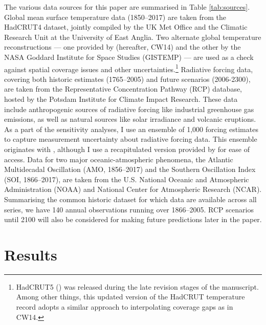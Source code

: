 \documentclass[smallextended]{svjour3}       %
\begin{document}
The various data sources for this paper are summarised in Table
\ref{tab:sources}. Global mean surface temperature data (1850--2017) are
taken from the HadCRUT4 dataset, jointly compiled by the UK Met Office
and the Climatic Research Unit at the University of East Anglia. Two
alternate global temperature reconstructions --- one provided by
\cite{cowtan2014coverage} (hereafter, CW14) and the other by the NASA
Goddard Institute for Space Studies (GISTEMP) --- are used as a check
against spatial coverage issues and other uncertainties.\footnote{HadCRUT5
  (\cite{morice2020hadcrut5}) was released during the late revision
  stages of the manuscript. Among other things, this updated version of
  the HadCRUT temperature record adopts a similar approach to
  interpolating coverage gaps as in CW14.} Radiative forcing data,
covering both historic estimates (1765--2005) and future scenarios
(2006-2300), are taken from the Representative Concentration Pathway
(RCP) database, hosted by the Potsdam Institute for Climate Impact
Research. These data include anthropogenic sources of radiative forcing
like industrial greenhouse gas emissions, as well as natural sources
like solar irradiance and volcanic eruptions. As a part of the
sensitivity analyses, I use an ensemble of 1,000 forcing estimates to
capture measurement uncertainty about radiative forcing data. This
ensemble originates with \cite{dessler2018ecs}, although I use a
recapitulated version provided by \cite{hausfather2020evaluating} for
ease of access. Data for two major oceanic-atmospheric phenomena, the
Atlantic Multidecadal Oscillation (AMO, 1856--2017) and the Southern
Oscillation Index (SOI, 1866--2017), are taken from the U.S. National
Oceanic and Atmospheric Administration (NOAA) and National Center for
Atmospheric Research (NCAR). Summarising the common historic dataset for
which data are available across all series, we have 140 annual
observations running over 1866--2005. RCP scenarios until 2100 will also
be considered for making future predictions later in the paper.

\hypertarget{sec:results}{%
\section{Results}\label{sec:results}}
\end{document}

